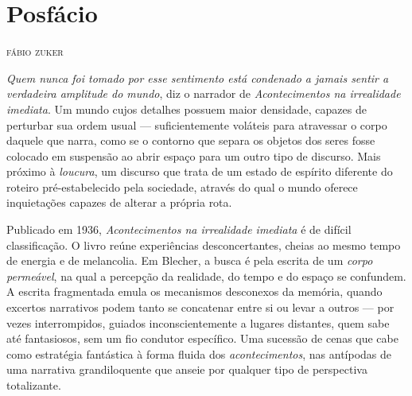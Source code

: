 \newcommand{\subtitulo}[1]{\NoCaseChange{\textnormal{\break\Large\itshape#1}}}
\chapter*{Posfácio\smallskip\subtitulo{O instável mundo\\de Max Blecher}}

\begin{flushright}
\textsc{fábio zuker}
\end{flushright}


\textit{Quem nunca foi tomado por esse sentimento está condenado a jamais sentir a verdadeira amplitude do mundo}, diz o narrador de \textit{Acontecimentos na irrealidade imediata}. Um mundo cujos detalhes possuem maior densidade, capazes de perturbar sua ordem usual --- suficientemente voláteis para atravessar o corpo daquele que narra, como se o contorno que separa os objetos dos seres fosse colocado em suspensão ao abrir espaço para um outro tipo de discurso. Mais próximo à \textit{loucura}, um discurso que trata de um estado de espírito diferente do roteiro pré-estabelecido pela sociedade, através do qual o mundo oferece inquietações capazes de alterar a própria rota.

Publicado em 1936, \textit{Acontecimentos na irrealidade imediata} é de difícil classificação. O livro reúne experiências desconcertantes, cheias ao mesmo tempo de energia e de melancolia. Em Blecher, a busca é pela escrita de um \textit{corpo permeável}, na qual a percepção da realidade, do tempo e do espaço se confundem. A escrita fragmentada emula os mecanismos desconexos da memória, quando excertos narrativos podem tanto se concatenar entre si ou levar a outros --- por vezes interrompidos, guiados inconscientemente a lugares distantes, quem sabe até fantasiosos, sem um fio condutor específico. Uma sucessão de cenas que cabe como estratégia fantástica à forma fluida dos \textit{acontecimentos}, nas antípodas de uma narrativa grandiloquente que anseie por qualquer tipo de perspectiva totalizante.

